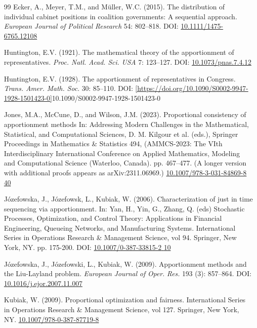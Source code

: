 \documentclass[pdflatex,sn-mathphys-num]{sn-jnl}
\theoremstyle{thmstyleone}%
\theoremstyle{thmstyletwo}%
\theoremstyle{thmstylethree}%
\begin{document}
\begin{thebibliography}{99}
 Ecker, A., Meyer, T.M., and M\"uller, W.C. (2015). The distribution of individual cabinet positions in coalition governments: A sequential approach. {\it European Journal of Political Research} 54: 802--818. DOI: \href{https://doi.org/10.1111/1475-6765.12108}{10.1111/1475-6765.12108}

 Huntington, E.V. (1921). The mathematical theory of the apportionment of representatives. {\it Proc. Natl. Acad. Sci. USA} 7: 123--127. DOI: \href{https://doi.org/10.1073/pnas.7.4.12}{10.1073/pnas.7.4.12}

 Huntington, E.V. (1928). The apportionment of representatives in Congress. {\it Trans. Amer. Math. Soc.} 30: 85--110. DOI: \ref{https://doi.org/10.1090/S0002-9947-1928-1501423-0}{10.1090/S0002-9947-1928-1501423-0}

 Jones, M.A., McCune, D., and Wilson, J.M. (2023). Proportional consistency of apportionment methods In: Addressing Modern Challenges in the Mathematical,
Statistical, and Computational Sciences, D. M. Kilgour et al. (eds.), Springer Proceedings in Mathematics \&
Statistics 494, (AMMCS-2023: The VIth Interdisciplinary International Conference on Applied Mathematics, Modeling and Computational Science (Waterloo, Canada). pp. 467--477. (A longer version with additional proofs appears as arXiv:2311.06969.) \href{https://doi.org/10.1007/978-3-031-84869-8_40}{10.1007/978-3-031-84869-8\underline{ }40}

 J\'{o}zefowska, J., J\'{o}zefowsk, L., Kubiak, W. (2006). Characterization of just in time sequencing via apportionment. In: Yan, H., Yin, G., Zhang, Q. (eds) Stochastic Processes, Optimization, and Control Theory: Applications in Financial Engineering, Queueing Networks, and Manufacturing Systems. International Series in Operations Research \& Management Science, vol 94. Springer, New York, NY. pp. 175-200.
DOI: \href{https://doi.org/10.1007/0-387-33815-2_10}{10.1007/0-387-33815-2\underline{ }10}

 J\'{o}zefowska, J., J\'{o}zefowski, L., Kubiak, W. (2009). Apportionment methods and the {L}iu-{L}ayland problem. {\it European Journal of Oper. Res.} 193 (3): 857--864. DOI: \href{https://doi.org/10.1016/j.ejor.2007.11.007}{10.1016/j.ejor.2007.11.007}

  Kubiak, W. (2009). Proportional optimization and fairness. International Series in Operations Research \& Management Science, vol 127. Springer, New York, NY. \href{https://doi.org/10.1007/978-0-387-87719-8}{10.1007/978-0-387-87719-8}


\end{thebibliography}
\end{document}
